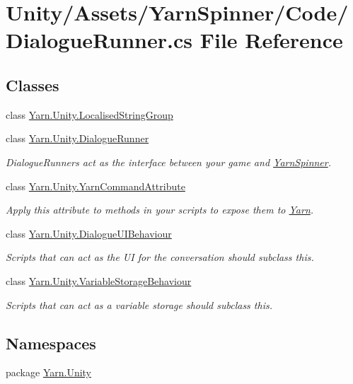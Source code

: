 \hypertarget{a00292}{\section{Unity/\-Assets/\-Yarn\-Spinner/\-Code/\-Dialogue\-Runner.cs File Reference}
\label{a00292}
}
\subsection*{Classes}
\begin{DoxyCompactItemize}
\item 
class \hyperlink{a00135_a00378}{Yarn.\-Unity.\-Localised\-String\-Group}
\item 
class \hyperlink{a00093}{Yarn.\-Unity.\-Dialogue\-Runner}
\begin{DoxyCompactList}\small\item\em Dialogue\-Runners act as the interface between your game and \hyperlink{a00371}{Yarn\-Spinner}. \end{DoxyCompactList}\item 
class \hyperlink{a00193}{Yarn.\-Unity.\-Yarn\-Command\-Attribute}
\begin{DoxyCompactList}\small\item\em Apply this attribute to methods in your scripts to expose them to \hyperlink{a00051}{Yarn}. \end{DoxyCompactList}\item 
class \hyperlink{a00095}{Yarn.\-Unity.\-Dialogue\-U\-I\-Behaviour}
\begin{DoxyCompactList}\small\item\em Scripts that can act as the U\-I for the conversation should subclass this. \end{DoxyCompactList}\item 
class \hyperlink{a00191}{Yarn.\-Unity.\-Variable\-Storage\-Behaviour}
\begin{DoxyCompactList}\small\item\em Scripts that can act as a variable storage should subclass this. \end{DoxyCompactList}\end{DoxyCompactItemize}
\subsection*{Namespaces}
\begin{DoxyCompactItemize}
\item 
package \hyperlink{a00135}{Yarn.\-Unity}
\end{DoxyCompactItemize}


